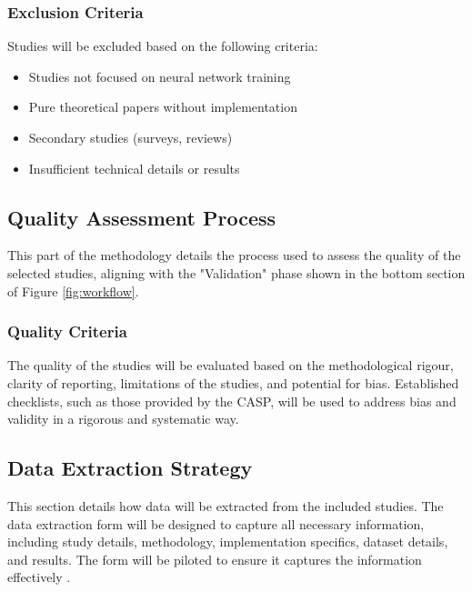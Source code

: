\subsubsection{Exclusion Criteria}
Studies will be excluded based on the following criteria:
\begin{itemize}
    \item Studies not focused on neural network training
    \item Pure theoretical papers without implementation
    \item Secondary studies (surveys, reviews)
    \item Insufficient technical details or results
\end{itemize}

\subsection{Quality Assessment Process}
\label{sec:quality-assessment-process}
This part of the methodology details the process used to assess the quality of the selected studies, aligning with the "Validation" phase shown in the bottom section of Figure \ref{fig:workflow}.

\subsubsection{Quality Criteria}
The quality of the studies will be evaluated based on the methodological rigour, clarity of reporting, limitations of the studies, and potential for bias. Established checklists, such as those provided by the CASP, will be used to address bias and validity in a rigorous and systematic way.

\subsection{Data Extraction Strategy}
\label{sec:data-extraction-strategy}
This section details how data will be extracted from the included studies. The data extraction form will be designed to capture all necessary information, including study details, methodology, implementation specifics, dataset details, and results. The form will be piloted to ensure it captures the information effectively \cite{ben-nun_demystifying_2020}.


